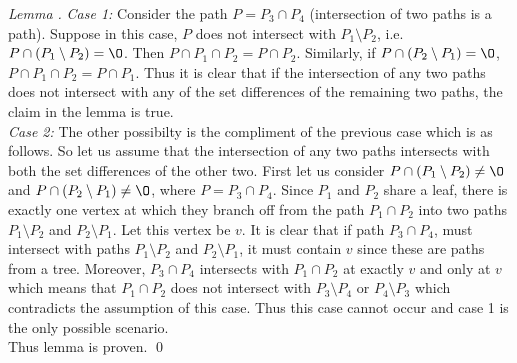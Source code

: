 \documentclass{fsttcs}
\begin{document}
\begin{proof}[Lemma \label{lem:fourpaths}]
  {\em Case 1:} Consider the path $P = P_3 \cap P_4$ (intersection of
  two paths is a path).
  Suppose in this case, $P$ does not intersect with $P_1 \setminus
  P_2$, i.e. $P \cap (P_1 \setminus P_2) = \O$. Then $P \cap P_1 \cap
  P_2 = P \cap P_2$. Similarly, if $P \cap (P_2 \setminus P_1) = \O$,
  $P \cap P_1 \cap P_2 = P \cap P_1$. Thus it is clear that if the
  intersection of any two paths does not intersect with any of the set
  differences of
  the remaining two paths, the claim in the lemma is true.\\
  {\em Case 2:} The other possibilty is the compliment of the previous
  case which is as follows. So let us assume that the intersection of
  any two paths intersects with both the set differences of the other
  two. First let us consider $P \cap (P_1 \setminus P_2) \ne \O$ and
  $P \cap (P_2 \setminus P_1) \ne \O$, where $P = P_3 \cap P_4$. Since
  $P_1$ and $P_2$ share a leaf, there is exactly one vertex at which
  they branch off from the path $P_1 \cap P_2$ into two paths $P_1
  \setminus P_2$ and $P_2 \setminus P_1$. Let this vertex be $v$. It
  is clear that if path $P_3 \cap P_4$, must intersect with paths $P_1
  \setminus P_2$ and $P_2 \setminus P_1$, it must contain $v$ since
  these are paths from a tree. Moreover, $P_3 \cap P_4$ intersects
  with $P_1 \cap P_2$ at exactly $v$ and only at $v$ which means that
  $P_1 \cap P_2$ does not intersect with $P_3 \setminus P_4$ or $P_4
  \setminus P_3$ which contradicts the assumption of this case. Thus
  this  case cannot occur and case 1 is the only possible scenario. \\
  Thus lemma is proven. \qed
\end{proof}
\end{document}
